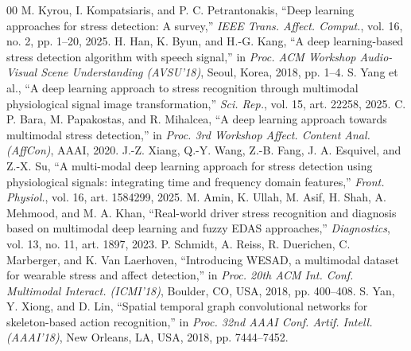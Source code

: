\documentclass[conference]{IEEEtran}
\begin{document}
\begin{thebibliography}{00}
 M. Kyrou, I. Kompatsiaris, and P. C. Petrantonakis, ``Deep learning approaches for stress detection: A survey,'' \textit{IEEE Trans. Affect. Comput.}, vol. 16, no. 2, pp. 1--20, 2025.
 H. Han, K. Byun, and H.-G. Kang, ``A deep learning-based stress detection algorithm with speech signal,'' in \textit{Proc. ACM Workshop Audio-Visual Scene Understanding (AVSU'18)}, Seoul, Korea, 2018, pp. 1--4.
 S. Yang et al., ``A deep learning approach to stress recognition through multimodal physiological signal image transformation,'' \textit{Sci. Rep.}, vol. 15, art. 22258, 2025.
 C. P. Bara, M. Papakostas, and R. Mihalcea, ``A deep learning approach towards multimodal stress detection,'' in \textit{Proc. 3rd Workshop Affect. Content Anal. (AffCon)}, AAAI, 2020.
 J.-Z. Xiang, Q.-Y. Wang, Z.-B. Fang, J. A. Esquivel, and Z.-X. Su, ``A multi-modal deep learning approach for stress detection using physiological signals: integrating time and frequency domain features,'' \textit{Front. Physiol.}, vol. 16, art. 1584299, 2025.
 M. Amin, K. Ullah, M. Asif, H. Shah, A. Mehmood, and M. A. Khan, ``Real-world driver stress recognition and diagnosis based on multimodal deep learning and fuzzy EDAS approaches,'' \textit{Diagnostics}, vol. 13, no. 11, art. 1897, 2023.
 P. Schmidt, A. Reiss, R. Duerichen, C. Marberger, and K. Van Laerhoven, ``Introducing WESAD, a multimodal dataset for wearable stress and affect detection,'' in \textit{Proc. 20th ACM Int. Conf. Multimodal Interact. (ICMI'18)}, Boulder, CO, USA, 2018, pp. 400--408.
 S. Yan, Y. Xiong, and D. Lin, ``Spatial temporal graph convolutional networks for skeleton-based action recognition,'' in \textit{Proc. 32nd AAAI Conf. Artif. Intell. (AAAI'18)}, New Orleans, LA, USA, 2018, pp. 7444--7452.
\end{thebibliography}
\end{document}
